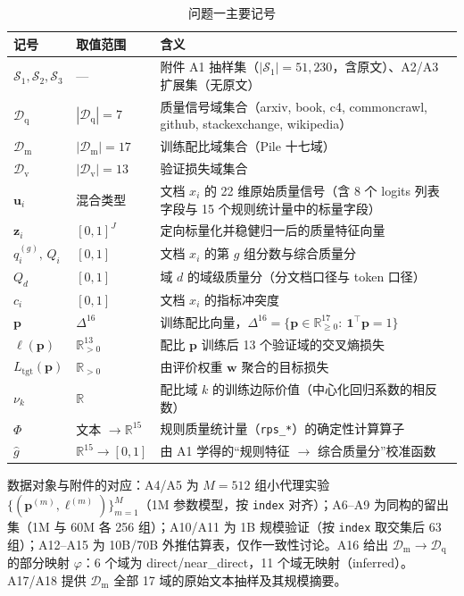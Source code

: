 \begin{table}[htbp]
  \centering
  \caption{问题一主要记号}
  \label{tab:p1-notation}
  \begin{tabular}{llp{7.8cm}}
    \toprule
    记号 & 取值范围 & 含义 \\
    \midrule
    $\mathcal{S}_1,\mathcal{S}_2,\mathcal{S}_3$ & --- & 附件 A1 抽样集（$|\mathcal{S}_1|=51{,}230$，含原文）、A2/A3 扩展集（无原文） \\
    $\mathcal{D}_{\mathrm{q}}$ & $|\mathcal{D}_{\mathrm{q}}|=7$ & 质量信号域集合（arxiv, book, c4, commoncrawl, github, stackexchange, wikipedia） \\
    $\mathcal{D}_{\mathrm{m}}$ & $|\mathcal{D}_{\mathrm{m}}|=17$ & 训练配比域集合（Pile 十七域） \\
    $\mathcal{D}_{\mathrm{v}}$ & $|\mathcal{D}_{\mathrm{v}}|=13$ & 验证损失域集合 \\
    $\bm{u}_i$ & 混合类型 & 文档 $x_i$ 的 22 维原始质量信号（含 8 个 logits 列表字段与 15 个规则统计量中的标量字段） \\
    $\bm{z}_i$ & $[0,1]^{J}$ & 定向标量化并稳健归一后的质量特征向量 \\
    $q_i^{(g)},\,Q_i$ & $[0,1]$ & 文档 $x_i$ 的第 $g$ 组分数与综合质量分 \\
    $Q_d$ & $[0,1]$ & 域 $d$ 的域级质量分（分文档口径与 token 口径） \\
    $c_i$ & $[0,1]$ & 文档 $x_i$ 的指标冲突度 \\
    $\bm{p}$ & $\Delta^{16}$ & 训练配比向量，$\Delta^{16}=\{\bm{p}\in\mathbb{R}^{17}_{\ge 0}:\ \bm{1}^\top\bm{p}=1\}$ \\
    $\bm{\ell}(\bm{p})$ & $\mathbb{R}^{13}_{>0}$ & 配比 $\bm{p}$ 训练后 13 个验证域的交叉熵损失 \\
    $L_{\mathrm{tgt}}(\bm{p})$ & $\mathbb{R}_{>0}$ & 由评价权重 $\bm{w}$ 聚合的目标损失 \\
    $\nu_k$ & $\mathbb{R}$ & 配比域 $k$ 的训练边际价值（中心化回归系数的相反数） \\
    $\Phi$ & 文本 $\to\mathbb{R}^{15}$ & 规则质量统计量（\texttt{rps\_*}）的确定性计算算子 \\
    $\hat g$ & $\mathbb{R}^{15}\to[0,1]$ & 由 A1 学得的“规则特征 $\to$ 综合质量分”校准函数 \\
    \bottomrule
  \end{tabular}
\end{table}

数据对象与附件的对应：A4/A5 为 $M=512$ 组小代理实验 $\{(\bm{p}^{(m)},\bm{\ell}^{(m)})\}_{m=1}^{M}$（1M 参数模型，按 \texttt{index} 对齐）；A6--A9 为同构的留出集（1M 与 60M 各 256 组）；A10/A11 为 1B 规模验证（按 \texttt{index} 取交集后 63 组）；A12--A15 为 10B/70B 外推估算表，仅作一致性讨论。A16 给出 $\mathcal{D}_{\mathrm{m}}\to\mathcal{D}_{\mathrm{q}}$ 的部分映射 $\varphi$：6 个域为 direct/near\_direct，11 个域无映射（inferred）。A17/A18 提供 $\mathcal{D}_{\mathrm{m}}$ 全部 17 域的原始文本抽样及其规模摘要。

